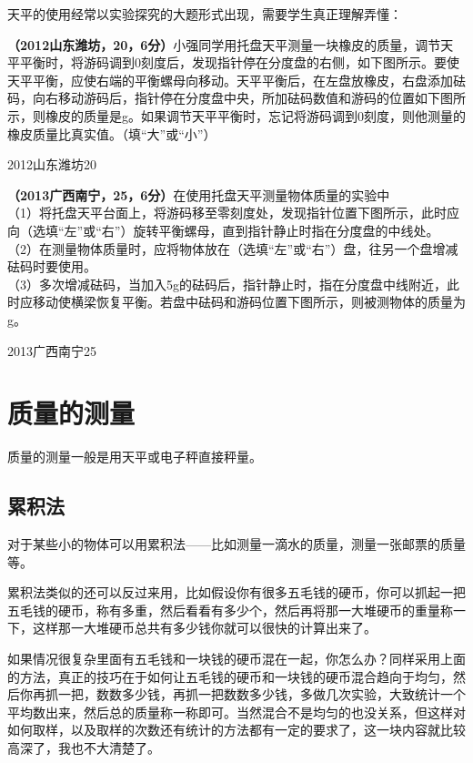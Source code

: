 \documentclass[12pt,twoside]{exam}
\begin{document}
\begin{knowledge}
天平的使用经常以实验探究的大题形式出现，需要学生真正理解弄懂：

\textbf{（2012山东潍坊，20，6分）}小强同学用托盘天平测量一块橡皮的质量，调节天平平衡时，将游码调到0刻度后，发现指针停在分度盘的右侧，如下图所示。要使天平平衡，应使右端的平衡螺母向\answerline*[左]移动。天平平衡后，在左盘放橡皮，右盘添加砝码，向右移动游码后，指针停在分度盘中央，所加砝码数值和游码的位置如下图所示，则橡皮的质量是\answerline*[33.2]g。如果调节天平平衡时，忘记将游码调到0刻度，则他测量的橡皮质量比真实值\answerline*[大]。（填“大”或“小”）
\begin{linefig}[0.9]{2012山东潍坊20}
\end{linefig}

\textbf{（2013广西南宁，25，6分）}在使用托盘天平测量物体质量的实验中\\
（1）将托盘天平\answerline*[水平]台面上，将游码移至零刻度处，发现指针位置下图所示，此时应向\answerline*[右]（选填“左”或“右”）旋转平衡螺母，直到指针静止时指在分度盘的中线处。\\
（2）在测量物体质量时，应将物体放在\answerline*[左]（选填“左”或“右”）盘，往另一个盘增减砝码时要使用\answerline*[镊子]。\\
（3）多次增减砝码，当加入5g的砝码后，指针静止时，指在分度盘中线附近，此时应移动\answerline*[游码]使横梁恢复平衡。若盘中砝码和游码位置下图所示，则被测物体的质量为\answerline*[78.4]g。
\begin{linefig}[0.9]{2013广西南宁25}
\end{linefig}


\section{质量的测量}
质量的测量一般是用天平或电子秤直接秤量。

\subsection{累积法}
对于某些小的物体可以用累积法——比如测量一滴水的质量，测量一张邮票的质量等。

累积法类似的还可以反过来用，比如假设你有很多五毛钱的硬币，你可以抓起一把五毛钱的硬币，称有多重，然后看看有多少个，然后再将那一大堆硬币的重量称一下，这样那一大堆硬币总共有多少钱你就可以很快的计算出来了。

如果情况很复杂里面有五毛钱和一块钱的硬币混在一起，你怎么办？同样采用上面的方法，真正的技巧在于如何让五毛钱的硬币和一块钱的硬币混合趋向于均匀，然后你再抓一把，数数多少钱，再抓一把数数多少钱，多做几次实验，大致统计一个平均数出来，然后总的质量称一称即可。当然混合不是均匀的也没关系，但这样对如何取样，以及取样的次数还有统计的方法都有一定的要求了，这一块内容就比较高深了，我也不大清楚了。


\end{knowledge}
\end{document}
